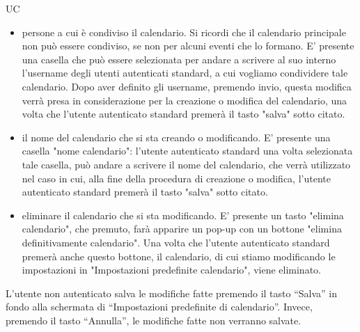 \begin{listaPersonale}{UC}
\begin{listaPersonale2}[UC] {}
\begin{enumerate}
\begin{itemize}
                          \item persone a cui è condiviso il calendario. Si ricordi che il calendario principale non può essere condiviso, se non per alcuni eventi che lo formano. E' presente una casella che può essere selezionata per andare a scrivere al suo interno l'username degli utenti autenticati standard, a cui vogliamo condividere tale calendario.
                                Dopo aver definito gli username, premendo invio, questa modifica verrà presa in considerazione per la creazione o modifica del calendario, una volta che l'utente autenticato standard premerà il tasto "salva" sotto citato.
                          \item il nome del calendario che si sta creando o modificando. E' presente una casella "nome calendario": l'utente autenticato standard una volta selezionata tale casella, può andare a scrivere il nome del calendario, che verrà utilizzato nel caso in cui, alla fine della procedura di creazione o modifica, l'utente autenticato standard premerà il tasto "salva" sotto citato.
                          \item eliminare il calendario che si sta modificando. E' presente un tasto "elimina calendario", che premuto, farà apparire un pop-up con un bottone "elimina definitivamente calendario". Una volta che l'utente autenticato standard premerà anche questo bottone, il calendario, di cui stiamo modificando le impostazioni in "Impostazioni predefinite calendario", viene eliminato.
                      \end{itemize}
                      L'utente non autenticato salva le modifiche fatte premendo il tasto “Salva” in fondo alla schermata di “Impostazioni predefinite di calendario”. Invece, premendo il tasto “Annulla”, le modifiche fatte non verranno salvate.
            \end{enumerate}


\end{listaPersonale2}
\end{listaPersonale}
